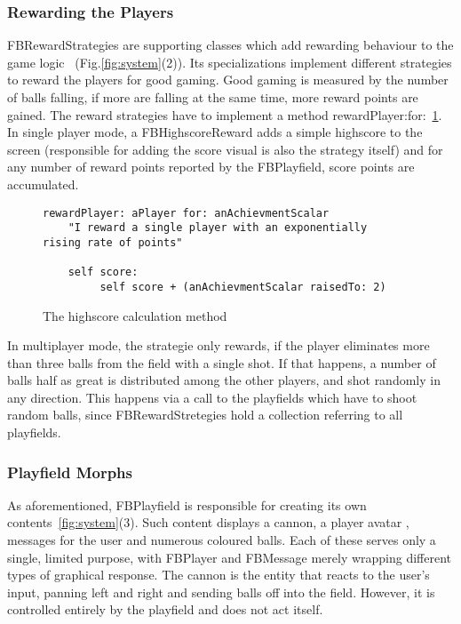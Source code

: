 \subsubsection{Rewarding the Players}
FBRewardStrategies are supporting classes which add rewarding behaviour 
to the game logic
~(Fig.\ref{fig:system}(2)). Its specializations 
implement different strategies to
reward the players for good gaming. Good gaming is measured by the 
number of balls falling, if more are falling at the same time, more 
reward points are gained.
The reward strategies have to implement a method
rewardPlayer:for:~\ref{lst:reward}.\\
In single player mode, a FBHighscoreReward
adds a simple highscore to the screen (responsible for adding the 
score visual is also the strategy itself) and for any number of 
reward points reported by the FBPlayfield, score points are accumulated.
%
\begin{figure}
  \begin{center}
    \begin{lstlisting}
rewardPlayer: aPlayer for: anAchievmentScalar
    "I reward a single player with an exponentially 
rising rate of points" 

    self score:
         self score + (anAchievmentScalar raisedTo: 2)
    \end{lstlisting}
  \end{center}
  \caption{The highscore calculation method}
  \label{lst:reward}
\end{figure}
In multiplayer mode, the strategie only rewards, if the player eliminates 
more than three balls from the field with a single shot. If that happens, 
a number of balls half as great is distributed among the other players,
and shot randomly in any direction. This happens via a call to 
the playfields which have to shoot random balls, since FBRewardStretegies
hold a collection referring to all playfields.
%
\subsubsection{Playfield Morphs}
As aforementioned, FBPlayfield is responsible for creating its own 
contents~\ref{fig:system}(3). Such content displays a cannon, a 
player avatar , messages for the user and numerous coloured balls. 
Each of these serves only a single, limited purpose, with FBPlayer 
and FBMessage merely wrapping different types of graphical response.
The cannon is the entity that reacts to the user's input, panning 
left and right and sending balls off into the field. However, it 
is controlled entirely by the playfield and does not act itself.

